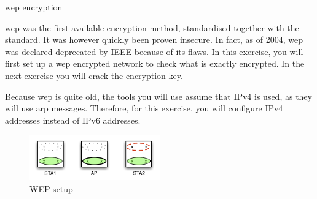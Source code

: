 \begin{exercise}{\ac{wep} encryption}
\label{ex:wep}

	\ac{wep} was the first available encryption method, standardised together with the \wifi standard. It was however quickly been proven insecure. In fact, as of 2004, \ac{wep} was declared deprecated by IEEE because of its flaws. In this exercise, you will first set up a \ac{wep} encrypted network to check what is exactly encrypted. In the next exercise you will crack the encryption key.
	
Because \ac{wep} is quite old, the tools you will use assume that IPv4 is used, as they will use \ac{arp} messages. Therefore, for this exercise, you will configure IPv4 addresses instead of IPv6 addresses.

\begin{figure}[h!]
		\begin{center}
			\includegraphics[width=0.5\textwidth]{images/wepcrack.pdf}
			\caption{WEP setup} 
			\label{fig:wepcrack} 
		\end{center}
	\end{figure}
	

\end{exercise}
